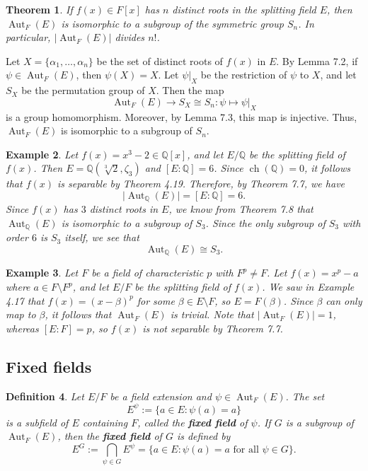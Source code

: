 \documentclass[10pt]{article}
\makeatletter
\newcommand{\Q}{\mathbb{Q}}
\DeclareMathOperator{\Aut}{Aut}
\DeclareMathOperator{\ch}{ch}
\theoremstyle{newstyle}
\newtheorem{thm}{Theorem}[section]
\newtheorem{defn}[thm]{Definition}
\newtheorem{exmp}[thm]{Example}
\newenvironment{pf}[1][\proofname]{\par
  \pushQED{\qed}%
  \normalfont \topsep0\p@\relax
  \trivlist
  \item[\hskip\labelsep\scshape
  #1\@addpunct{.}]\ignorespaces
}{%
  \popQED\endtrivlist\@endpefalse
}
\makeatother
\begin{document}
\begin{thm}
If $f(x) \in F[x]$ has $n$ distinct roots in the splitting field $E$, then $\Aut_F(E)$ is 
isomorphic to a subgroup of the symmetric group $S_n$. In particular, 
$\lvert\Aut_F(E)\rvert$ divides $n!$. 
\end{thm}
\begin{pf}
Let $X = \{\alpha_1, \dots, \alpha_n\}$ be the set of distinct roots of $f(x)$ in $E$. 
By Lemma 7.2, if $\psi \in \Aut_F(E)$, then $\psi(X) = X$. Let $\psi|_X$ be the restriction of 
$\psi$ to $X$, and let $S_X$ be the permutation group of $X$. Then the map 
\[ \Aut_F(E) \to S_X \cong S_n : \psi \mapsto \psi|_X \] 
is a group homomorphism. Moreover, by Lemma 7.3, this map is injective. Thus, 
$\Aut_F(E)$ is isomorphic to a subgroup of $S_n$. 
\end{pf}

\begin{exmp}
Let $f(x) = x^3 - 2 \in \Q[x]$, and let $E/\Q$ be the splitting field of $f(x)$. 
Then $E = \Q(\sqrt[3]{2}, \zeta_3)$ and $[E : \Q] = 6$. Since $\ch(\Q) = 0$, it follows that 
$f(x)$ is separable by Theorem 4.19. Therefore, by Theorem 7.7, we have 
\[ \lvert \Aut_{\Q}(E) \rvert = [E : \Q] = 6. \]
Since $f(x)$ has $3$ distinct roots in $E$, we know from Theorem 7.8 that $\Aut_{\Q}(E)$ 
is isomorphic to a subgroup of $S_3$. Since the only subgroup of $S_3$ with order $6$ 
is $S_3$ itself, we see that 
\[ \Aut_{\Q}(E) \cong S_3. \]
\end{exmp}

\begin{exmp}
Let $F$ be a field of characteristic $p$ with $F^p \neq F$. Let $f(x) = x^p - a$ where 
$a \in F \setminus F^p$, and let $E/F$ be the splitting field of $f(x)$. 
We saw in Example 4.17 that $f(x) = (x-\beta)^p$ for some $\beta \in E \setminus F$, so 
$E = F(\beta)$. Since $\beta$ can only map to $\beta$, it follows that 
$\Aut_F(E)$ is trivial. Note that $\lvert \Aut_F(E) \rvert = 1$, whereas 
$[E : F] = p$, so $f(x)$ is not separable by Theorem 7.7. 
\end{exmp}

\subsection{Fixed fields}

\begin{defn}
Let $E/F$ be a field extension and $\psi \in \Aut_F(E)$. The set 
\[ E^\psi := \{a \in E : \psi(a) = a\} \] 
is a subfield of $E$ containing $F$, called the {\bf fixed field} of $\psi$. If 
$G$ is a subgroup of $\Aut_F(E)$, then the {\bf fixed field} of $G$ is defined by 
\[ E^G := \bigcap_{\psi \in G} E^\psi = \{a \in E : \psi(a) = a \text{ for all } \psi \in G\}. \]
\end{defn}
\end{document}
